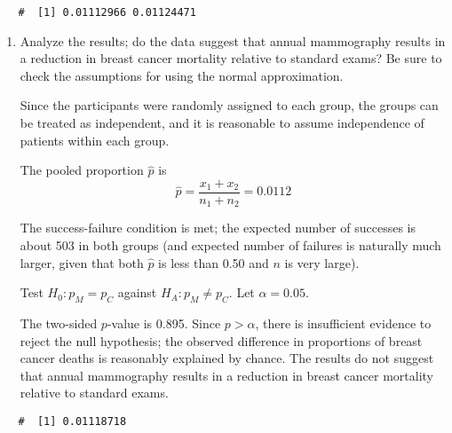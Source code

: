 \documentclass[letterpaper,12pt,twoside,]{pinp}
\begin{document}
\begin{enumerate}
  \begin{ShadedResult}
   \begin{verbatim}
   #  [1] 0.01112966 0.01124471
   \end{verbatim}
   \end{ShadedResult}

  \begin{enumerate}
  \def\labelenumii{\alph{enumii})}
  \setcounter{enumii}{1}
  \item
    Analyze the results; do the data suggest that annual mammography
    results in a reduction in breast cancer mortality relative to
    standard exams? Be sure to check the assumptions for using the
    normal approximation.

    \color{blue}

    Since the participants were randomly assigned to each group, the
    groups can be treated as independent, and it is reasonable to assume
    independence of patients within each group.

    The pooled proportion \(\hat{p}\) is
    \[\hat{p} = \dfrac{x_1 + x_2}{n_1 + n_2} = 0.0112\]

    The success-failure condition is met; the expected number of
    successes is about 503 in both groups (and expected number of
    failures is naturally much larger, given that both \(\hat{p}\) is
    less than 0.50 and \(n\) is very large).

    Test \(H_0: p_M = p_C\) against \(H_A: p_M \neq p_C\). Let
    \(\alpha = 0.05\).

    The two-sided \(p\)-value is 0.895. Since \(p > \alpha\), there is
    insufficient evidence to reject the null hypothesis; the observed
    difference in proportions of breast cancer deaths is reasonably
    explained by chance. The results do not suggest that annual
    mammography results in a reduction in breast cancer mortality
    relative to standard exams.

    \color{black}
  \end{enumerate}

\begin{Shaded}
\begin{Highlighting}[]
\StringTok{ }\OperatorTok{/}
\end{Highlighting}
\end{Shaded}

  \begin{ShadedResult}
   \begin{verbatim}
   #  [1] 0.01118718
   \end{verbatim}
   \end{ShadedResult}


\end{enumerate}
\end{document}
